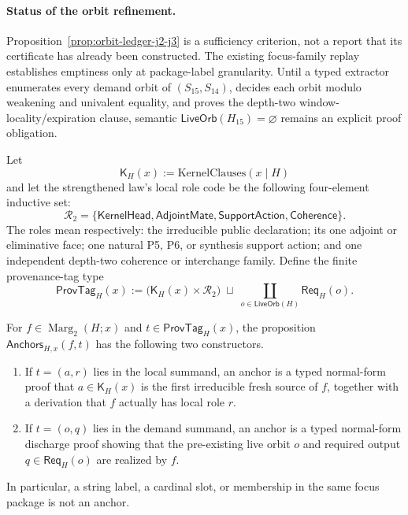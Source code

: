 \paragraph{Status of the orbit refinement.}
Proposition~\ref{prop:orbit-ledger-j2-j3} is a sufficiency criterion, not a
report that its certificate has already been constructed. The existing
focus-family replay establishes emptiness only at package-label granularity.
Until a typed extractor enumerates every demand orbit of
\((S_{15},S_{14})\), decides each orbit modulo weakening and univalent
equality, and proves the depth-two window-locality/expiration clause, semantic
\(\mathsf{LiveOrb}(H_{15})=\varnothing\) remains an explicit proof obligation.

\begin{definition}
\label{ax:extraction-guarded-provenance}
Let
\[
  \mathsf K_H(x):=\mathrm{KernelClauses}(x\mid H)
\]
and let the strengthened law's local role code be the following four-element
inductive set:
\[
  \mathcal R_2=\{
  \mathsf{KernelHead},
  \mathsf{AdjointMate},
  \mathsf{SupportAction},
  \mathsf{Coherence}\}.
\]
The roles mean respectively: the irreducible public declaration; its one
adjoint or eliminative face; one natural P5, P6, or synthesis support action;
and one independent depth-two coherence or interchange family. Define the
finite provenance-tag type
\[
  \mathsf{ProvTag}_H(x)
  :=
  \bigl(\mathsf K_H(x)\times\mathcal R_2\bigr)
  \;\sqcup\;
  \coprod_{o\in\mathsf{LiveOrb}(H)}\mathsf{Req}_H(o).
\]

For \(f\in\operatorname{Marg}_2(H;x)\) and
\(t\in\mathsf{ProvTag}_H(x)\), the proposition
\(\mathsf{Anchors}_{H,x}(f,t)\) has the following two constructors.
\begin{enumerate}[leftmargin=*, label=\textbf{A\arabic*.}]
\item If \(t=(a,r)\) lies in the local summand, an anchor is a typed
normal-form proof that \(a\in\mathsf K_H(x)\) is the first irreducible fresh
source of \(f\), together with a derivation that \(f\) actually has local role
\(r\).
\item If \(t=(o,q)\) lies in the demand summand, an anchor is a typed
normal-form discharge proof showing that the pre-existing live orbit \(o\) and
required output \(q\in\mathsf{Req}_H(o)\) are realized by \(f\).
\end{enumerate}
In particular, a string label, a cardinal slot, or membership in the same
focus package is not an anchor.


\end{definition}
